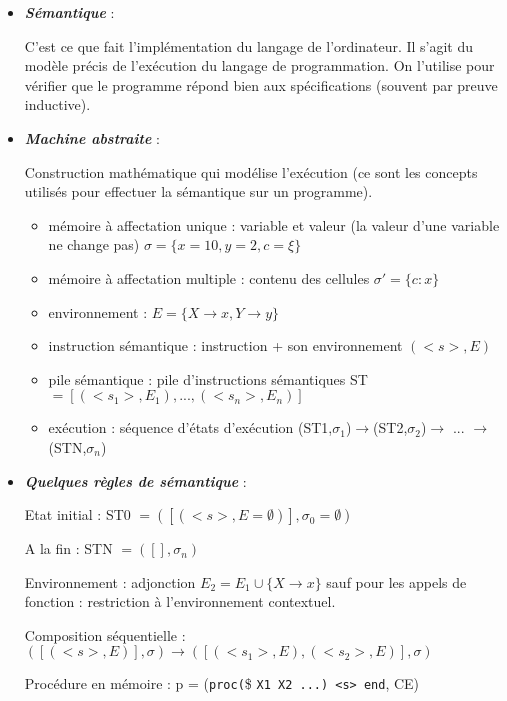 \begin{itemize}
  \item \textbf{\textit{Sémantique}} :

    C'est ce que fait l'implémentation du langage de l'ordinateur. Il s'agit du modèle précis de l'exécution du langage de programmation. On l'utilise pour vérifier que le programme répond bien aux spécifications (souvent par preuve inductive).

  \item \textbf{\textit{Machine abstraite}} :

    Construction mathématique qui modélise l'exécution (ce sont les concepts utilisés pour effectuer la sémantique sur un programme).
    \begin{itemize}
      \item mémoire à affectation unique : variable et valeur (la valeur d'une variable ne change pas) 
        $\sigma = \{ x=10, y=2, c=\xi\}$

      \item mémoire à affectation multiple : contenu des cellules
        $\sigma' = \{c:x\}$

      \item environnement : 
        $E= \{ X\rightarrow x, Y \rightarrow y\}$

      \item instruction sémantique : instruction + son environnement 
        $(<s>,E)$

      \item pile sémantique : pile d'instructions sémantiques ST 
        $=[(<s_1>,E_1),...,(<s_n>,E_n)]$

      \item exécution : séquence d'états d'exécution
        (ST1,$\sigma_1$)$\rightarrow$(ST2,$\sigma_2$)$\rightarrow$ $...$ $\rightarrow$(STN,$\sigma_n$)
    \end{itemize}

  \item \textbf{\textit{Quelques règles de sémantique}} :

    Etat initial : ST0 $=([(<s>,E=\emptyset)],\sigma_0=\emptyset)$

    A la fin : STN $=([],\sigma_n)$

    Environnement : adjonction $E_2 = E_1 \cup \{X\rightarrow x\}$
    sauf pour les appels de fonction : restriction à l'environnement contextuel.

    Composition séquentielle : $([(<s>,E)],\sigma) \rightarrow ([(<s_1>,E),(<s_2>,E)],\sigma)$

    Procédure en mémoire : p = (\verb$proc($\$ \verb$X1 X2 ...) <s> end$, CE)


\end{itemize}
